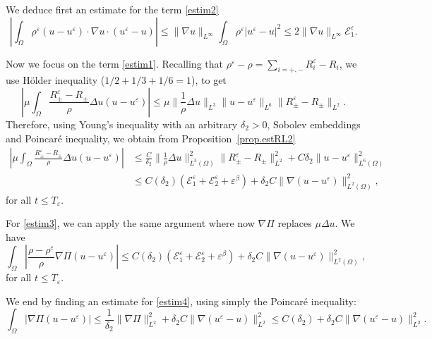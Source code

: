 \documentclass[11pt, twoside, a4paper]{article}
\theoremstyle{plain}
\theoremstyle{remark}
\numberwithin{equation}{section}
\def\EE{{\mathcal E}}
\renewcommand{\leq}{\leqslant}\renewcommand{\le}{\leqslant}
\newcommand{\eps}{\varepsilon}
\begin{document}
We deduce first an estimate for the term \eqref{estim2}
\begin{equation*}
 \left\lvert \int_{\Omega} \rho^\eps (u-u^\eps) \cdot \nabla u \cdot (u^\eps-u) \right\rvert \leq \lVert \nabla u \rVert_{L^\infty} \int_{\Omega} \rho^\eps \left\lvert u^\eps -u \right\rvert^2
 \leq 2\lVert \nabla u \rVert_{L^\infty} \EE^\eps_1.
\end{equation*}


Now we focus on the term \eqref{estim1}. Recalling that $\rho^\eps-\rho = \sum_{i=+,-}R_i^\eps - R_i$, we use Hölder inequality ($1/2+1/3+1/6=1$), to get
\begin{equation*}
 \left\lvert \mu \int_{\Omega} \frac{R_\pm^\eps - R_\pm}{\rho} \Delta u (u-u^\eps) \right\rvert \leq \mu \lVert \frac{1}{\rho} \Delta u \rVert_{L^3} \lVert u-u^\eps \rVert_{L^6} \lVert R_\pm^\eps - R_\pm \rVert_{L^2}.
\end{equation*}
Therefore, using Young’s inequality with an arbitrary $\delta_2 >0$, Sobolev embeddings and Poincaré inequality, we obtain from Proposition~\ref{prop.estRL2} 
\begin{align*}
 \left\lvert \mu \int_{\Omega} \frac{R_\pm^\eps - R_\pm}{\rho} \Delta u (u-u^\eps) \right\rvert 
 &\leq \frac{C}{\delta_2} \lVert \frac{1}{\rho} \Delta u \rVert_{L^3(\Omega)}^2\lVert R_\pm^\eps - R_\pm \rVert_{L^2}^2 + C \delta_2 \lVert u-u^\eps \rVert_{L^6(\Omega)}^2\\
& \leq C(\delta_2) (\EE^\eps_1 +\EE^\eps_{2} +\eps^\beta) + \delta_2 C \lVert \nabla (u-u^\eps) \rVert^2_{L^2(\Omega)},
\end{align*}
for all $t\leq T_\eps$.

For \eqref{estim3}, we can apply the same argument where now $\nabla \Pi$ replaces $\mu\Delta u$. We have 
\begin{equation*}
 \int_{\Omega} \left\lvert \frac{\rho-\rho^\eps}{\rho} \nabla \Pi (u-u^\eps) \right\rvert \leq C(\delta_2) (\EE^\eps_1 +\EE^\eps_{2} +\eps^\beta) + \delta_2 C \lVert \nabla (u-u^\eps) \rVert^2_{L^2(\Omega)},
\end{equation*}
for all $t\leq T_\eps$.

 We end by finding an estimate for \eqref{estim4}, using simply the Poincaré inequality:
\begin{equation*}
 \int_{\Omega} \left\lvert \nabla \Pi(u-u^\eps) \right\rvert \leq \frac{1}{\delta_2} \lVert \nabla \Pi \rVert_{L^2}^2 + \delta_2 C \lVert \nabla( u^\eps - u) \rVert_{L^2}^2\leq C(\delta_2)+ \delta_2 C \lVert \nabla( u^\eps - u) \rVert_{L^2}^2.
\end{equation*}
\end{document}
